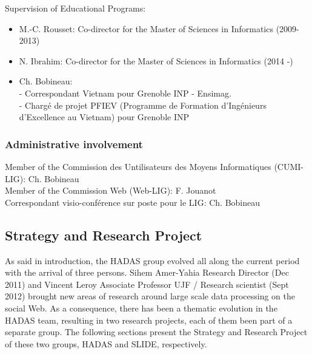Supervision of Educational Programs:
\begin{itemize}

\item M.-C. Rousset: Co-director for the Master of Sciences in Informatics (2009-2013)

\item N. Ibrahim: Co-director for the Master of Sciences in Informatics (2014 -) 

\item Ch. Bobineau:  \\
- Correspondant Vietnam pour Grenoble INP - Ensimag. \\
- Charg{\'e} de projet PFIEV (Programme de Formation d'Ing\'enieurs d'Excellence au Vietnam) pour Grenoble INP

\end {itemize}

\subsubsection*{Administrative involvement}

Member of the Commission des Untilisateurs des Moyens Informatiques (CUMI-LIG): Ch. Bobineau  \\
Member of the Commission Web (Web-LIG): F. Jouanot \\
Correspondant visio-conf\'erence sur poste pour le LIG: Ch. Bobineau


\subsection{Strategy and Research Project} %
\label{sub:hadas_strategy_and_research_project}


As said in introduction, the HADAS group evolved all along the current
period with the arrival of three persons. Sihem Amer-Yahia Research
Director (Dec 2011) and Vincent Leroy Associate Professor UJF /
Research scientist (Sept 2012) brought new areas of research around
large scale data processing on the social Web. As a consequence, there
has been a  thematic evolution in the HADAS team, resulting in two
research projects, each of them been part of a separate group. The
following sections present the Strategy and Research Project of these
two groups, HADAS and SLIDE, respectively.

